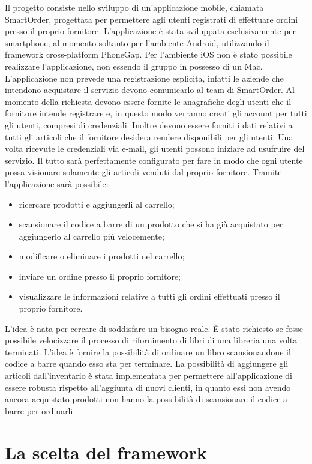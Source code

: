 \documentclass[12pt, a4paper, titlepage]{report}
\begin{document}
	Il progetto consiste nello sviluppo di un'applicazione mobile, chiamata SmartOrder, progettata per permettere agli utenti registrati di effettuare ordini presso il proprio fornitore. L'applicazione è stata sviluppata esclusivamente per smartphone, al momento soltanto per l'ambiente Android, utilizzando il framework cross-platform PhoneGap. Per l'ambiente iOS non è stato possibile realizzare l'applicazione, non essendo il gruppo in possesso di un Mac. L'applicazione non prevede una registrazione esplicita, infatti le aziende che intendono acquistare il servizio devono comunicarlo al team di SmartOrder. Al momento della richiesta devono essere fornite le anagrafiche degli utenti che il fornitore intende registrare e, in questo modo verranno creati gli account per tutti gli utenti, compresi di credenziali. Inoltre devono essere forniti i dati relativi a tutti gli articoli che il fornitore desidera rendere disponibili per gli utenti. Una volta ricevute le credenziali via e-mail, gli utenti possono iniziare ad usufruire del servizio. Il tutto sarà perfettamente configurato per fare in modo che ogni utente possa visionare solamente gli articoli venduti dal proprio fornitore. Tramite l'applicazione sarà possibile:
	\begin{itemize}
		\item ricercare prodotti e aggiungerli al carrello;
		\item scansionare il codice a barre di un prodotto che si ha già acquistato per aggiungerlo al carrello più velocemente;
		\item modificare o eliminare i prodotti nel carrello;
		\item inviare un ordine presso il proprio fornitore;
		\item visualizzare le informazioni relative a tutti gli ordini effettuati presso il proprio fornitore.
	\end{itemize}
	L'idea è nata per cercare di soddisfare un bisogno reale. È stato richiesto se fosse possibile velocizzare il processo di rifornimento di libri di una libreria una volta terminati. L'idea è fornire la possibilità di ordinare un libro scansionandone il codice a barre quando esso sta per terminare. La possibilità di aggiungere gli articoli dall'inventario è stata implementata per permettere all'applicazione di essere robusta rispetto all'aggiunta di nuovi clienti, in quanto essi non avendo ancora acquistato prodotti non hanno la possibilità di scansionare il codice a barre per ordinarli.
	
	\section{La scelta del framework}
	
\end{document}
